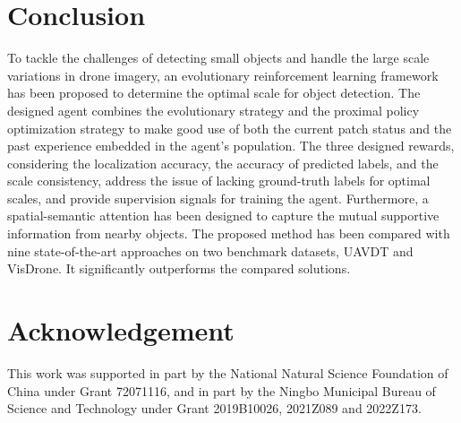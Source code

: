 \documentclass[letterpaper]{article} %
\begin{document}
\section{Conclusion}
\label{sec: conclusion}
To tackle the challenges of detecting small objects and handle the large scale variations in drone imagery, an evolutionary reinforcement learning framework %
has been proposed to determine the optimal scale for object detection. %
The designed agent combines the evolutionary strategy and the proximal policy optimization strategy to make good use of both the current patch status and the past experience embedded in the agent's population. The three designed rewards, considering the localization accuracy, the accuracy of predicted labels, and the scale consistency, address the issue of lacking ground-truth labels for optimal scales, and provide supervision signals for training the agent. Furthermore, a spatial-semantic attention %
has been designed to capture the mutual supportive information from nearby objects. The proposed method %
has been compared with nine state-of-the-art approaches on two benchmark datasets, UAVDT and VisDrone. It significantly outperforms the compared solutions. %


\section{Acknowledgement}
This work was supported in part by the National Natural Science Foundation of China under Grant 72071116, and in part by the Ningbo Municipal Bureau of Science and Technology under Grant 2019B10026, 2021Z089 and 2022Z173.


\end{document}
